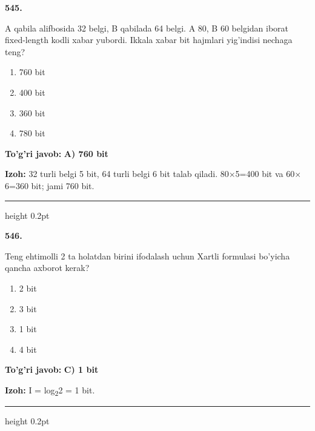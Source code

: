 \documentclass[10pt,a4paper,oneside]{article}
\begin{document}
\noindent\textbf{\color{ink}545.}
\par
A qabila alifbosida 32 belgi, B qabilada 64 belgi. A 80, B 60 belgidan iborat fixed-length kodli xabar yubordi. Ikkala xabar bit hajmlari yig'indisi nechaga teng?
\begin{enumerate}[label=\Alph*),leftmargin=9mm]
\item 760 bit
\item 400 bit
\item 360 bit
\item 780 bit
\end{enumerate}
\begin{tcolorbox}[enhanced,breakable,colback=teal!4,colframe=teal!50!black,boxrule=0.5pt,arc=1.1mm,left=3mm,right=3mm,top=1.7mm,bottom=1.7mm,before skip=2mm,after skip=2mm]
\textbf{\color{teal}To'g'ri javob:} \textbf{A) 760 bit}
\par\smallskip
\textbf{Izoh:} 32 turli belgi 5 bit, 64 turli belgi 6 bit talab qiladi. 80\ensuremath{\times}5=400 bit va 60\ensuremath{\times}6=360 bit; jami 760 bit.
\end{tcolorbox}
\vspace{2mm}\hrule height 0.2pt \vspace{3mm}

\noindent\textbf{\color{ink}546.}
\par
Teng ehtimolli 2 ta holatdan birini ifodalash uchun Xartli formulasi bo'yicha qancha axborot kerak?
\begin{enumerate}[label=\Alph*),leftmargin=9mm]
\item 2 bit
\item 3 bit
\item 1 bit
\item 4 bit
\end{enumerate}
\begin{tcolorbox}[enhanced,breakable,colback=teal!4,colframe=teal!50!black,boxrule=0.5pt,arc=1.1mm,left=3mm,right=3mm,top=1.7mm,bottom=1.7mm,before skip=2mm,after skip=2mm]
\textbf{\color{teal}To'g'ri javob:} \textbf{C) 1 bit}
\par\smallskip
\textbf{Izoh:} I = log\textsubscript{2}2 = 1 bit.
\end{tcolorbox}
\vspace{2mm}\hrule height 0.2pt \vspace{3mm}
\end{document}
